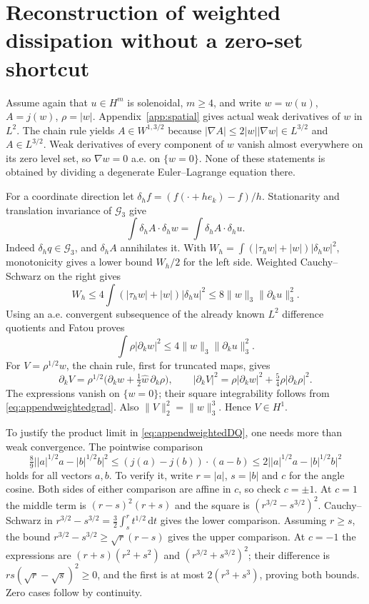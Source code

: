 \documentclass[11pt,a4paper]{article}
\theoremstyle{definition}\newtheorem{definition}[theorem]{Definition}
\theoremstyle{remark}\newtheorem{remark}[theorem]{Remark}
\newcommand{\G}{\mathcal G_3}
\newcommand{\dd}{\,\mathrm d}
\newcommand{\norm}[1]{\lVert #1\rVert}
\numberwithin{equation}{section}
\begin{document}
\section{Reconstruction of weighted dissipation without a zero-set shortcut}
\label{app:weighted}
Assume again that $u\in H^m$ is solenoidal, $m\ge4$, and write $w=w(u)$, $A=j(w)$, $\rho=|w|$. Appendix~\ref{app:spatial} gives actual weak derivatives of $w$ in $L^2$. The chain rule yields $A\in W^{1,3/2}$ because
$|\nabla A|\le2|w||\nabla w|\in L^{3/2}$ and $A\in L^{3/2}$. Weak derivatives of every component of $w$ vanish almost everywhere on its zero level set, so $\nabla w=0$ a.e. on $\{w=0\}$. None of these statements is obtained by dividing a degenerate Euler--Lagrange equation there.

For a coordinate direction let $\delta_hf=(f(\cdot+he_k)-f)/h$. Stationarity and translation invariance of $\G$ give
\begin{equation}\label{eq:appendweightedDQ}
 \int\delta_hA\cdot\delta_hw=\int\delta_hA\cdot\delta_hu.
\end{equation}
Indeed $\delta_hq\in\G$, and $\delta_hA$ annihilates it. With
$W_h=\int(|\tau_hw|+|w|)|\delta_hw|^2$, monotonicity gives a lower bound $W_h/2$ for the left side. Weighted Cauchy--Schwarz on the right gives
\[
 W_h\le4\int(|\tau_hw|+|w|)|\delta_hu|^2
 \le8\norm w_3\norm{\partial_ku}_3^2.
\]
Using an a.e. convergent subsequence of the already known $L^2$ difference quotients and Fatou proves
\begin{equation}\label{eq:appendweightedgrad}
 \int\rho|\partial_kw|^2\le4\norm w_3\norm{\partial_ku}_3^2.
\end{equation}
For $V=\rho^{1/2}w$, the chain rule, first for truncated maps, gives
\[
 \partial_kV=\rho^{1/2}\bigl(\partial_kw+\tfrac12\widehat w\,\partial_k\rho\bigr),
 \qquad
 |\partial_kV|^2=\rho|\partial_kw|^2+\tfrac54\rho|\partial_k\rho|^2.
\]
The expressions vanish on $\{w=0\}$; their square integrability follows from \eqref{eq:appendweightedgrad}. Also $\norm V_2^2=\norm w_3^3$. Hence $V\in H^1$.

To justify the product limit in \eqref{eq:appendweightedDQ}, one needs more than weak convergence. The pointwise comparison
\begin{equation}\label{eq:appendVcomp}
 \tfrac89\bigl||a|^{1/2}a-|b|^{1/2}b\bigr|^2
 \le(j(a)-j(b))\cdot(a-b)
 \le2\bigl||a|^{1/2}a-|b|^{1/2}b\bigr|^2
\end{equation}
holds for all vectors $a,b$. To verify it, write $r=|a|$, $s=|b|$ and $c$ for the angle cosine. Both sides of either comparison are affine in $c$, so check $c=\pm1$. At $c=1$ the middle term is $(r-s)^2(r+s)$ and the square is $(r^{3/2}-s^{3/2})^2$. Cauchy--Schwarz in
$r^{3/2}-s^{3/2}=\frac32\int_s^r t^{1/2}\dd t$ gives the lower comparison. Assuming $r\ge s$, the bound
$r^{3/2}-s^{3/2}\ge\sqrt r(r-s)$ gives the upper comparison. At $c=-1$ the expressions are $(r+s)(r^2+s^2)$ and $(r^{3/2}+s^{3/2})^2$; their difference is $rs(\sqrt r-\sqrt s)^2\ge0$, and the first is at most $2(r^3+s^3)$, proving both bounds. Zero cases follow by continuity.
\end{document}
